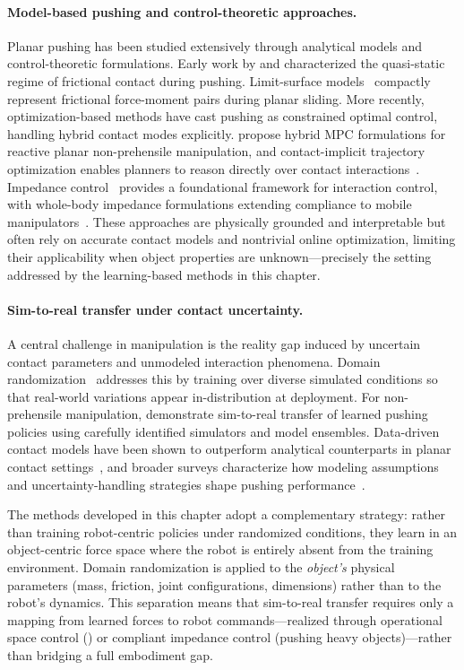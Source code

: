 \paragraph{Model-based pushing and control-theoretic approaches.}
Planar pushing has been studied extensively through analytical models and control-theoretic formulations. Early work by \citet{mason1986mechanics} and \citet{lynch1996stable} characterized the quasi-static regime of frictional contact during pushing. Limit-surface models~\citep{goyal1991planar} compactly represent frictional force-moment pairs during planar sliding. More recently, optimization-based methods have cast pushing as constrained optimal control, handling hybrid contact modes explicitly. \citet{hogan2018reactive,hogan2020reactive} propose hybrid MPC formulations for reactive planar non-prehensile manipulation, and contact-implicit trajectory optimization enables planners to reason directly over contact interactions~\citep{bui2025push}. Impedance control~\citep{hogan1985impedance} provides a foundational framework for interaction control, with whole-body impedance formulations extending compliance to mobile manipulators~\citep{dietrich2016wholebody}. These approaches are physically grounded and interpretable but often rely on accurate contact models and nontrivial online optimization, limiting their applicability when object properties are unknown---precisely the setting addressed by the learning-based methods in this chapter.


\paragraph{Sim-to-real transfer under contact uncertainty.}
A central challenge in manipulation is the reality gap induced by uncertain contact parameters and unmodeled interaction phenomena. Domain randomization~\citep{tobin2017domain,peng2018sim} addresses this by training over diverse simulated conditions so that real-world variations appear in-distribution at deployment. For non-prehensile manipulation, \citet{lowrey2018simtoreal} demonstrate sim-to-real transfer of learned pushing policies using carefully identified simulators and model ensembles. Data-driven contact models have been shown to outperform analytical counterparts in planar contact settings~\citep{fazeli2017learning}, and broader surveys characterize how modeling assumptions and uncertainty-handling strategies shape pushing performance~\citep{stuber2020survey}.

The methods developed in this chapter adopt a complementary strategy: rather than training robot-centric policies under randomized conditions, they learn in an object-centric force space where the robot is entirely absent from the training environment. Domain randomization is applied to the \emph{object's} physical parameters (mass, friction, joint configurations, dimensions) rather than to the robot's dynamics. This separation means that sim-to-real transfer requires only a mapping from learned forces to robot commands---realized through operational space control (\FLEX{}) or compliant impedance control (pushing heavy objects)---rather than bridging a full embodiment gap.


